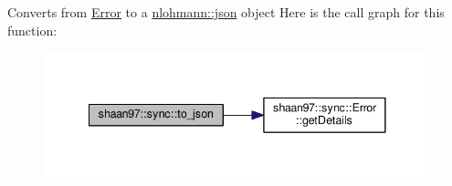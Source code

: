 Converts from {\ttfamily \hyperlink{classshaan97_1_1sync_1_1_error}{Error}} to a {\ttfamily \hyperlink{namespacenlohmann_a2bfd99e845a2e5cd90aeaf1b1431f474}{nlohmann\+::json}} object Here is the call graph for this function\+:\nopagebreak
\begin{figure}[H]
\begin{center}
\leavevmode
\includegraphics[width=341pt]{namespaceshaan97_1_1sync_a6ccb9e98c182a3bac3ee37ad64f76bbc_cgraph}
\end{center}
\end{figure}
